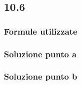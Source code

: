 \documentclass[../../main.tex]{subfiles}
\begin{document}
\subsection*{10.6}
\subsubsection*{Formule utilizzate}
\subsubsection*{Soluzione punto a}
\subsubsection*{Soluzione punto b}
\newpage
\end{document}
